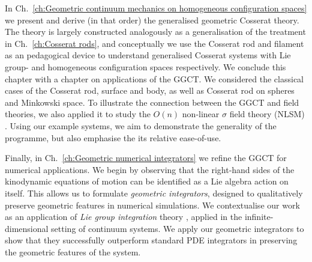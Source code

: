 \documentclass[]{cam-thesis}
\begin{document}
In Ch.~\ref{ch:Geometric continuum mechanics on homogeneous configuration spaces} we present and derive (in that order) the generalised geometric Cosserat theory. The theory is largely constructed analogously as a generalisation of the treatment in Ch.~\ref{ch:Cosserat rods}, and conceptually we use the Cosserat rod and filament as an pedagogical device to understand generalised Cosserat systems with Lie group- and homogeneous configuration spaces respectively. We conclude this chapter with a chapter on applications of the GGCT. We considered the classical cases of the Cosserat rod, surface and body, as well as Cosserat rod on spheres and Minkowski space. To illustrate the connection between the GGCT and field theories, we also applied it to study the $O(n)$ non-linear $\sigma$ field theory (NLSM) \citep{ketovQuantumNonlinearSigmaModels2013}. Using our example systems, we aim to demonstrate the generality of the programme, but also emphasise the its relative ease-of-use. 

Finally, in Ch.~\ref{ch:Geometric numerical integrators} we refine the GGCT for numerical applications. We begin by observing that the right-hand sides of the kinodynamic equations of motion can be identified as a Lie algebra action on itself. This allows us to formulate \textit{geometric integrators}, designed to qualitatively preserve geometric features in numerical simulations. We contextualise our work as an application of \textit{Lie group integration} theory  \citep{celledoniIntroductionLieGroup2014c, owrenLieGroupIntegrators2016, iserlesLiegroupMethods2005, celledoniLieGroupIntegrators2022a}, applied in the infinite-dimensional setting of continuum systems. We apply our geometric integrators to show that they successfully outperform standard PDE integrators in preserving the geometric features of the system.
\end{document}
